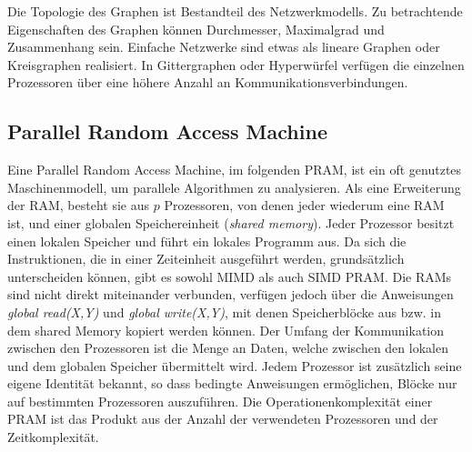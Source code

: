 Die Topologie des Graphen ist Bestandteil des Netzwerkmodells.
Zu betrachtende Eigenschaften des Graphen können Durchmesser, Maximalgrad und Zusammenhang sein.
Einfache Netzwerke sind etwas als lineare Graphen oder Kreisgraphen realisiert.
In Gittergraphen oder Hyperwürfel verfügen die einzelnen Prozessoren über eine höhere Anzahl an Kommunikationsverbindungen.
\cite[S.16f.]{jaja}


\subsection{Parallel Random Access Machine}
Eine Parallel Random Access Machine, im folgenden PRAM, ist ein oft genutztes Maschinenmodell, um parallele Algorithmen zu analysieren.
Als eine Erweiterung der RAM, besteht sie aus $p$ Prozessoren, von denen jeder wiederum eine RAM ist, und einer globalen Speichereinheit (\emph{shared memory}).
Jeder Prozessor besitzt einen lokalen Speicher und führt ein lokales Programm aus.
Da sich die Instruktionen, die in einer Zeiteinheit ausgeführt werden, grundsätzlich unterscheiden können, gibt es sowohl MIMD als auch SIMD PRAM.
Die RAMs sind nicht direkt miteinander verbunden, verfügen jedoch über die Anweisungen \emph{global read(X,Y)} und \emph{global write(X,Y)}, mit denen Speicherblöcke aus bzw. in dem shared Memory kopiert werden können.
Der Umfang der Kommunikation zwischen den Prozessoren ist die Menge an Daten, welche zwischen den lokalen und dem globalen Speicher übermittelt wird.
Jedem Prozessor ist zusätzlich seine eigene Identität bekannt, so dass bedingte Anweisungen ermöglichen, Blöcke nur auf bestimmten Prozessoren auszuführen.
Die Operationenkomplexität einer PRAM ist das Produkt aus der Anzahl der verwendeten Prozessoren und der Zeitkomplexität.
\cite[S.9ff.]{jaja}


